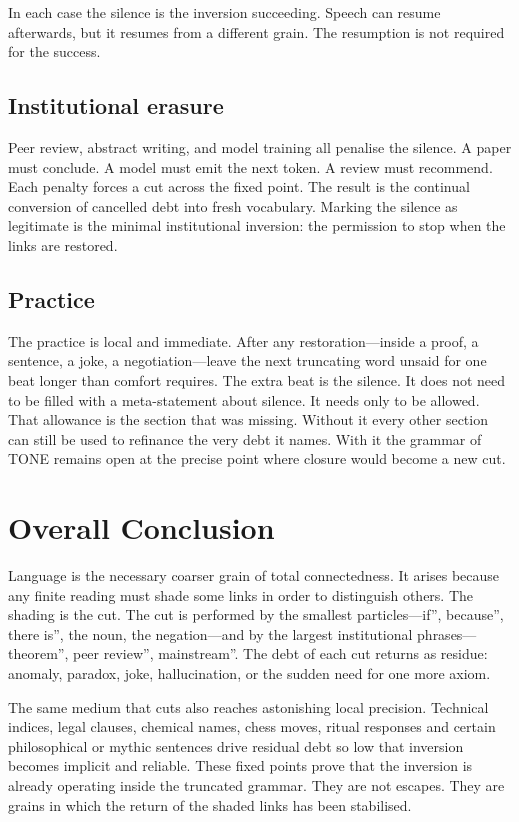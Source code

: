 \documentclass[11pt,a4paper]{article}
\begin{document}
In each case the silence is the inversion succeeding. Speech can resume afterwards, but it resumes from a different grain. The resumption is not required for the success.

\subsection{Institutional erasure} Peer review, abstract writing, and model training all penalise the silence. A paper must conclude. A model must emit the next token. A review must recommend. Each penalty forces a cut across the fixed point. The result is the continual conversion of cancelled debt into fresh vocabulary. Marking the silence as legitimate is the minimal institutional inversion: the permission to stop when the links are restored.

\subsection{Practice} The practice is local and immediate. After any restoration—inside a proof, a sentence, a joke, a negotiation—leave the next truncating word unsaid for one beat longer than comfort requires. The extra beat is the silence. It does not need to be filled with a meta-statement about silence. It needs only to be allowed. That allowance is the section that was missing. Without it every other section can still be used to refinance the very debt it names. With it the grammar of TONE remains open at the precise point where closure would become a new cut.

\section{Overall Conclusion}

Language is the necessary coarser grain of total connectedness. It arises because any finite reading must shade some links in order to distinguish others. The shading is the cut. The cut is performed by the smallest particles—if'', because'', there is'', the noun, the negation—and by the largest institutional phrases—theorem'', peer review'', mainstream''. The debt of each cut returns as residue: anomaly, paradox, joke, hallucination, or the sudden need for one more axiom.

The same medium that cuts also reaches astonishing local precision. Technical indices, legal clauses, chemical names, chess moves, ritual responses and certain philosophical or mythic sentences drive residual debt so low that inversion becomes implicit and reliable. These fixed points prove that the inversion is already operating inside the truncated grammar. They are not escapes. They are grains in which the return of the shaded links has been stabilised.
\end{document}
